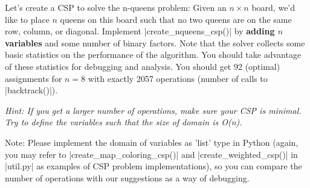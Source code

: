 \item {}
Let's create a CSP to solve the n-queens problem: Given an $n\times n$ board,
we'd like to place $n$ queens on this board such that no two queens are on the
same row, column, or diagonal. Implement |create_nqueens_csp()| by {\bf adding
$n$ variables} and some number of binary factors. Note that the solver collects
some basic statistics on the performance of the algorithm. You should take
advantage of these statistics for debugging and analysis. You should get 92
(optimal) assignments for $n=8$ with exactly 2057 operations (number of calls to
|backtrack()|). 

{\em Hint: If you get a larger number of operations, make sure your CSP is
minimal. Try to define the variables such that the size of domain is O(n).

Note: Please implement the domain of variables as 'list' type in Python (again,
you may refer to |create_map_coloring_csp()| and |create_weighted_csp()| in
|util.py| as examples of CSP problem implementations), so you can compare the
number of operations with our suggestions as a way of debugging.}
